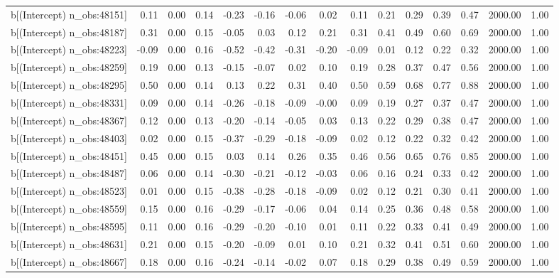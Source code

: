 \begin{table}[ht]
\begin{tabular}{rrrrrrrrrrrrrrr}
  b[(Intercept) n\_obs:48151] & 0.11 & 0.00 & 0.14 & -0.23 & -0.16 & -0.06 & 0.02 & 0.11 & 0.21 & 0.29 & 0.39 & 0.47 & 2000.00 & 1.00 \\ 
  b[(Intercept) n\_obs:48187] & 0.31 & 0.00 & 0.15 & -0.05 & 0.03 & 0.12 & 0.21 & 0.31 & 0.41 & 0.49 & 0.60 & 0.69 & 2000.00 & 1.00 \\ 
  b[(Intercept) n\_obs:48223] & -0.09 & 0.00 & 0.16 & -0.52 & -0.42 & -0.31 & -0.20 & -0.09 & 0.01 & 0.12 & 0.22 & 0.32 & 2000.00 & 1.00 \\ 
  b[(Intercept) n\_obs:48259] & 0.19 & 0.00 & 0.13 & -0.15 & -0.07 & 0.02 & 0.10 & 0.19 & 0.28 & 0.37 & 0.47 & 0.56 & 2000.00 & 1.00 \\ 
  b[(Intercept) n\_obs:48295] & 0.50 & 0.00 & 0.14 & 0.13 & 0.22 & 0.31 & 0.40 & 0.50 & 0.59 & 0.68 & 0.77 & 0.88 & 2000.00 & 1.00 \\ 
  b[(Intercept) n\_obs:48331] & 0.09 & 0.00 & 0.14 & -0.26 & -0.18 & -0.09 & -0.00 & 0.09 & 0.19 & 0.27 & 0.37 & 0.47 & 2000.00 & 1.00 \\ 
  b[(Intercept) n\_obs:48367] & 0.12 & 0.00 & 0.13 & -0.20 & -0.14 & -0.05 & 0.03 & 0.13 & 0.22 & 0.29 & 0.38 & 0.47 & 2000.00 & 1.00 \\ 
  b[(Intercept) n\_obs:48403] & 0.02 & 0.00 & 0.15 & -0.37 & -0.29 & -0.18 & -0.09 & 0.02 & 0.12 & 0.22 & 0.32 & 0.42 & 2000.00 & 1.00 \\ 
  b[(Intercept) n\_obs:48451] & 0.45 & 0.00 & 0.15 & 0.03 & 0.14 & 0.26 & 0.35 & 0.46 & 0.56 & 0.65 & 0.76 & 0.85 & 2000.00 & 1.00 \\ 
  b[(Intercept) n\_obs:48487] & 0.06 & 0.00 & 0.14 & -0.30 & -0.21 & -0.12 & -0.03 & 0.06 & 0.16 & 0.24 & 0.33 & 0.42 & 2000.00 & 1.00 \\ 
  b[(Intercept) n\_obs:48523] & 0.01 & 0.00 & 0.15 & -0.38 & -0.28 & -0.18 & -0.09 & 0.02 & 0.12 & 0.21 & 0.30 & 0.41 & 2000.00 & 1.00 \\ 
  b[(Intercept) n\_obs:48559] & 0.15 & 0.00 & 0.16 & -0.29 & -0.17 & -0.06 & 0.04 & 0.14 & 0.25 & 0.36 & 0.48 & 0.58 & 2000.00 & 1.00 \\ 
  b[(Intercept) n\_obs:48595] & 0.11 & 0.00 & 0.16 & -0.29 & -0.20 & -0.10 & 0.01 & 0.11 & 0.22 & 0.33 & 0.41 & 0.49 & 2000.00 & 1.00 \\ 
  b[(Intercept) n\_obs:48631] & 0.21 & 0.00 & 0.15 & -0.20 & -0.09 & 0.01 & 0.10 & 0.21 & 0.32 & 0.41 & 0.51 & 0.60 & 2000.00 & 1.00 \\ 
  b[(Intercept) n\_obs:48667] & 0.18 & 0.00 & 0.16 & -0.24 & -0.14 & -0.02 & 0.07 & 0.18 & 0.29 & 0.38 & 0.49 & 0.59 & 2000.00 & 1.00 \\ 

\end{tabular}
\end{table}
